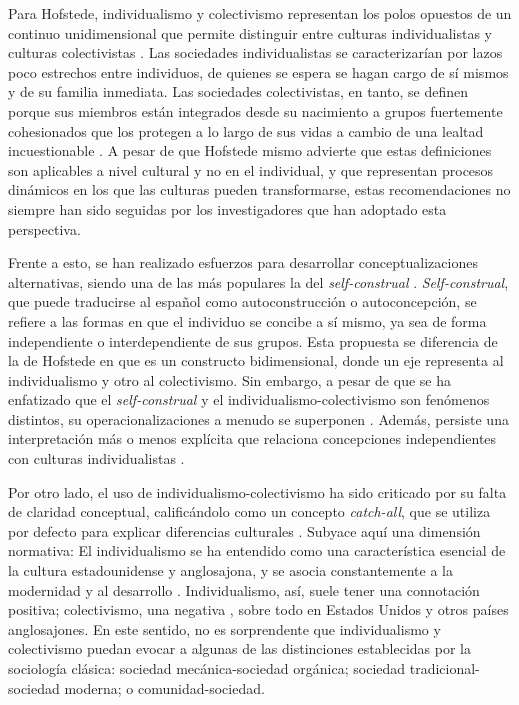 \documentclass[12pt,twoside]{templates/facsothesis}
\begin{document}
Para Hofstede, individualismo y colectivismo representan los polos opuestos de un continuo unidimensional que permite distinguir entre culturas individualistas y culturas colectivistas \citep{yoon2010}. Las sociedades individualistas se caracterizarían por lazos poco estrechos entre individuos, de quienes se espera se hagan cargo de sí mismos y de su familia inmediata. Las sociedades colectivistas, en tanto, se definen porque sus miembros están integrados desde su nacimiento a grupos fuertemente cohesionados que los protegen a lo largo de sus vidas a cambio de una lealtad incuestionable \citep{yoon2010}. A pesar de que Hofstede mismo advierte que estas definiciones son aplicables a nivel cultural y no en el individual, y que representan procesos dinámicos en los que las culturas pueden transformarse, estas recomendaciones no siempre han sido seguidas por los investigadores que han adoptado esta perspectiva.

Frente a esto, se han realizado esfuerzos para desarrollar conceptualizaciones alternativas, siendo una de las más populares la del \emph{self-construal} \citep{cross2011}. \emph{Self-construal}, que puede traducirse al español como autoconstrucción o autoconcepción, se refiere a las formas en que el individuo se concibe a sí mismo, ya sea de forma independiente o interdependiente de sus grupos. Esta propuesta se diferencia de la de Hofstede en que es un constructo bidimensional, donde un eje representa al individualismo y otro al colectivismo. Sin embargo, a pesar de que se ha enfatizado que el \emph{self-construal} y el individualismo-colectivismo son fenómenos distintos, su operacionalizaciones a menudo se superponen \citep{cross2011}. Además, persiste una interpretación más o menos explícita que relaciona concepciones independientes con culturas individualistas \citep{cross2011, voronov2002}.

Por otro lado, el uso de individualismo-colectivismo ha sido criticado por su falta de claridad conceptual, calificándolo como un concepto \emph{catch-all}, que se utiliza por defecto para explicar diferencias culturales \citep{voronov2002}. Subyace aquí una dimensión normativa: El individualismo se ha entendido como una característica esencial de la cultura estadounidense y anglosajona, y se asocia constantemente a la modernidad y al desarrollo \citep{voronov2002, wang2010, martuccelli2010}. Individualismo, así, suele tener una connotación positiva; colectivismo, una negativa \citep{moemeka1998}, sobre todo en Estados Unidos y otros países anglosajones. En este sentido, no es sorprendente que individualismo y colectivismo puedan evocar a algunas de las distinciones establecidas por la sociología clásica: sociedad mecánica-sociedad orgánica; sociedad tradicional-sociedad moderna; o comunidad-sociedad.
\end{document}

